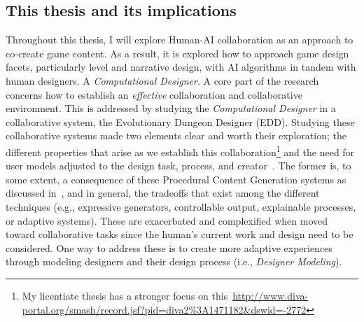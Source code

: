 
\subsection*{This thesis and its implications}



Throughout this thesis, I will explore Human-AI collaboration as an approach to co-create game content. As a result, it is explored how to approach game design facets, particularly level and narrative design, with AI algorithms in tandem with human designers. A \emph{Computational Designer}. A core part of the research concerns how to establish an \emph{effective} collaboration and collaborative environment. This is addressed by studying the \emph{Computational Designer} in a collaborative system, the Evolutionary Dungeon Designer (EDD). Studying these collaborative systems made two elements clear and worth their exploration; the different properties that arise as we establish this collaboration\footnote{My licentiate thesis has a stronger focus on this~\url{http://www.diva-portal.org/smash/record.jsf?pid=diva2\%3A1471182&dswid=-2772}} and the need for user models adjusted to the design task, process, and creator~\cite{liapis_designer_2013}. The former is, to some extent, a consequence of these Procedural Content Generation systems as discussed in~\cite{shaker_procedural_2016}, and in general, the tradeoffs that exist among the different techniques (e.g., expressive generators, controllable output, explainable processes, or adaptive systems). These are exacerbated and complexified when moved toward collaborative tasks since the human's current work and design need to be considered. One way to address these is to create more adaptive experiences through modeling designers and their design process (i.e., \emph{Designer Modeling}). 


